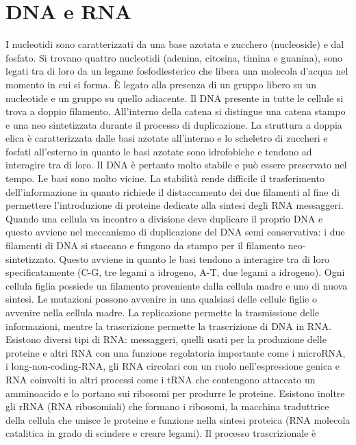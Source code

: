 \chapter{DNA e RNA}
I nucleotidi sono caratterizzati da una base azotata e 
zucchero (nucleoside) e dal fosfato. Si trovano quattro nucleotidi (adenina, citosina, timina e guanina), sono legati tra di loro da un legame fosfodiesterico che libera una molecola
d'acqua nel momento in cui si forma. \`E legato alla presenza di un gruppo  libero su un nucleotide e un gruppo  su quello adiacente. Il DNA presente in tutte le cellule si
trova a doppio filamento. All'interno della catena si distingue una catena stampo e una neo sintetizzata durante il processo di duplicazione. La struttura a doppia elica \`e 
caratterizzata dalle basi azotate all'interno e lo scheletro di zuccheri e fosfati all'esterno in quanto le basi azotate sono idrofobiche e tendono ad interagire tra di loro. Il DNA 
\`e pertanto molto stabile e pu\`o essere preservato nel tempo. Le basi sono molto vicine. La stabilit\`a rende difficile il trasferimento dell'informazione in quanto richiede 
il distaccamento dei due filamenti al fine di permettere l'introduzione di proteine dedicate alla sintesi degli RNA messaggeri. Quando una cellula va incontro a divisione deve duplicare
il proprio DNA e questo avviene nel meccanismo di duplicazione del DNA semi conservativa: i due filamenti di DNA si staccano e fungono da stampo per il filamento neo-sintetizzato. Questo
avviene in quanto le basi tendono a interagire tra di loro specificatamente (C-G, tre legami a idrogeno, A-T, due legami a idrogeno). Ogni cellula figlia possiede un filamento 
proveniente dalla cellula madre e uno di nuova sintesi. Le mutazioni possono avvenire in una qualsiasi delle cellule figlie o avvenire nella cellula madre. La replicazione permette la
trasmissione delle informazioni, mentre la trascrizione permette la trascrizione di DNA in RNA. Esistono diversi tipi di RNA: messaggeri, quelli usati per la produzione delle proteine e
altri RNA con una funzione regolatoria importante come i microRNA, i long-non-coding-RNA, gli RNA circolari con un ruolo nell'espressione genica e RNA coinvolti in altri processi come i 
tRNA che contengono attaccato un amminoacido e lo portano sui ribosomi per produrre le proteine. Esistono inoltre gli rRNA (RNA ribosomiali) che formano i ribosomi, la macchina 
traduttrice della cellula che unisce le proteine e funzione nella sintesi proteica (RNA molecola catalitica in grado di scindere e creare legami). Il processo trascrizionale \`e 

